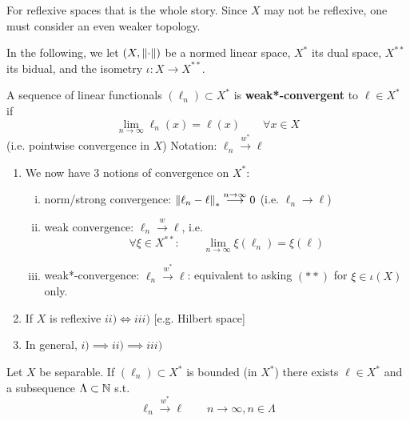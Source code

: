\documentclass{article}
\begin{document}
For reflexive spaces that is the whole story.  Since $X$ may not be reflexive, one must consider an even weaker topology.  

In the following, we let $(X, \left\|{\cdot}\right\|)$ be a normed linear space, $X^*$ its dual space, $X^{**}$ its bidual, and the isometry $\iota: X \to X^{**}$.  

\begin{definition}
    A sequence of linear functionals $(\ell_n) \subset X^*$ is \textbf{weak*-convergent} to $\ell \in X^*$ if  
    $$
    \lim_{n\to \infty} \ell_n(x) = \ell(x) \qquad \forall x\in X
    $$
    (i.e. pointwise convergence in $X$) Notation: $\ell_n \overset{w^*}{\longrightarrow} \ell$
\end{definition}  

\begin{remark}
\begin{enumerate}[1)]
    \item We now have 3 notions of convergence on $X^*$:
    \begin{enumerate}[i)]
        \item norm/strong convergence: $\left\|{\ell_n-\ell}\right\|_* \overset{n\to \infty}{\longrightarrow} 0$ (i.e. $\ell_n \to \ell$)
        \item weak convergence: $\ell_n \overset{w}{\longrightarrow} \ell$, i.e.  
        \begin{equation*}
        \forall \xi \in X^{**}: \qquad \lim_{n\to \infty} \xi(\ell_n) = \xi(\ell)    \tag{$**$}
        \end{equation*}
        \item weak*-convergence: $\ell_n \overset{w^*}{\longrightarrow} \ell$: equivalent to asking $(**)$ for $\xi \in \iota(X)$ only. 
    \end{enumerate}
    \item If $X$ is reflexive $ii) \iff iii)$ [e.g. Hilbert space]
    \item In general, $i) \implies ii) \implies iii)$
\end{enumerate}
    
\end{remark}

\begin{theorem}\nl
\label{thm: Banach-Alaoglu}
Let $X$ be separable. If $(\ell_n) \subset X^*$ is bounded (in $X^*$) there exists $\ell\in X^*$ and a subsequence $\Lambda \subset \mathbb{N}$ s.t.  
$$
\ell_n \overset{w^*}{\longrightarrow} \ell \qquad n \to \infty, n\in \Lambda
$$
\end{theorem}
\end{document}

